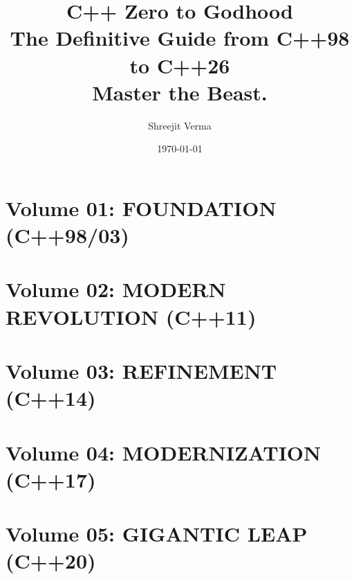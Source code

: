 \documentclass[11pt, a4paper, openany]{book}
\title{
    \vspace*{2cm}
    \Huge \textbf{C++ Zero to Godhood} \\
    \vspace{0.5cm}
    \LARGE The Definitive Guide from C++98 to C++26 \\
    \vspace{2cm}
    \textbf{\Large Master the Beast.}
}
\author{\Large Shreejit Verma}
\date{\today}
\begin{document}
\frontmatter
\maketitle
\tableofcontents

\mainmatter

\part{Volume 01: FOUNDATION (C++98/03)}









\part{Volume 02: MODERN REVOLUTION (C++11)}






\part{Volume 03: REFINEMENT (C++14)}




\part{Volume 04: MODERNIZATION (C++17)}






\part{Volume 05: GIGANTIC LEAP (C++20)}






\end{document}
